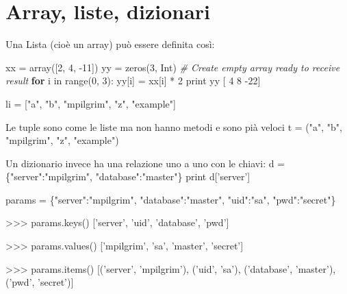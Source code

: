 \documentclass[]{article}
\newenvironment{Shaded}{}{}
\newcommand{\KeywordTok}[1]{\textcolor[rgb]{0.00,0.44,0.13}{\textbf{{#1}}}}
\newcommand{\DataTypeTok}[1]{\textcolor[rgb]{0.56,0.13,0.00}{{#1}}}
\newcommand{\DecValTok}[1]{\textcolor[rgb]{0.25,0.63,0.44}{{#1}}}
\newcommand{\StringTok}[1]{\textcolor[rgb]{0.25,0.44,0.63}{{#1}}}
\newcommand{\CommentTok}[1]{\textcolor[rgb]{0.38,0.63,0.69}{\textit{{#1}}}}
\newcommand{\NormalTok}[1]{{#1}}
\begin{document}
\section{Array, liste, dizionari}\label{array-liste-dizionari}

Una Lista (cioè un array) può essere definita così:

\begin{Shaded}
\begin{Highlighting}[]
\NormalTok{xx = array([}\DecValTok{2}\NormalTok{, }\DecValTok{4}\NormalTok{, -}\DecValTok{11}\NormalTok{])}
\NormalTok{yy = zeros(}\DecValTok{3}\NormalTok{, Int)        }\CommentTok{# Create empty array ready to receive result}
\KeywordTok{for} \NormalTok{i in }\DataTypeTok{range}\NormalTok{(}\DecValTok{0}\NormalTok{, }\DecValTok{3}\NormalTok{):}
     \NormalTok{yy[i] = xx[i] * }\DecValTok{2}
\DataTypeTok{print} \NormalTok{yy}
\NormalTok{[  }\DecValTok{4}   \DecValTok{8} \NormalTok{-}\DecValTok{22}\NormalTok{]}

\NormalTok{li = [}\StringTok{"a"}\NormalTok{, }\StringTok{"b"}\NormalTok{, }\StringTok{"mpilgrim"}\NormalTok{, }\StringTok{"z"}\NormalTok{, }\StringTok{"example"}\NormalTok{]}


\NormalTok{Le }\DataTypeTok{tuple} \NormalTok{sono come le liste ma non hanno metodi e sono pià veloci}
    \NormalTok{t = (}\StringTok{"a"}\NormalTok{, }\StringTok{"b"}\NormalTok{, }\StringTok{"mpilgrim"}\NormalTok{, }\StringTok{"z"}\NormalTok{, }\StringTok{"example"}\NormalTok{)}


\NormalTok{Un dizionario invece ha una relazione uno a uno con le chiavi:}
    \NormalTok{d = \{}\StringTok{"server"}\NormalTok{:}\StringTok{"mpilgrim"}\NormalTok{, }\StringTok{"database"}\NormalTok{:}\StringTok{"master"}\NormalTok{\} }
    \DataTypeTok{print} \NormalTok{d[}\StringTok{'server'}\NormalTok{]}

\NormalTok{params = \{}\StringTok{"server"}\NormalTok{:}\StringTok{"mpilgrim"}\NormalTok{, }\StringTok{"database"}\NormalTok{:}\StringTok{"master"}\NormalTok{, }\StringTok{"uid"}\NormalTok{:}\StringTok{"sa"}\NormalTok{, }\StringTok{"pwd"}\NormalTok{:}\StringTok{"secret"}\NormalTok{\}}

\NormalTok{>>> params.keys()   }
\NormalTok{[}\StringTok{'server'}\NormalTok{, }\StringTok{'uid'}\NormalTok{, }\StringTok{'database'}\NormalTok{, }\StringTok{'pwd'}\NormalTok{]}

\NormalTok{>>> params.values() }
\NormalTok{[}\StringTok{'mpilgrim'}\NormalTok{, }\StringTok{'sa'}\NormalTok{, }\StringTok{'master'}\NormalTok{, }\StringTok{'secret'}\NormalTok{]}

\NormalTok{>>> params.items()  }
\NormalTok{[(}\StringTok{'server'}\NormalTok{, }\StringTok{'mpilgrim'}\NormalTok{), (}\StringTok{'uid'}\NormalTok{, }\StringTok{'sa'}\NormalTok{), (}\StringTok{'database'}\NormalTok{, }\StringTok{'master'}\NormalTok{), (}\StringTok{'pwd'}\NormalTok{, }\StringTok{'secret'}\NormalTok{)]}
\end{Highlighting}
\end{Shaded}
\end{document}
